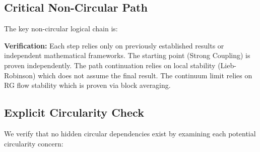 \subsection{Critical Non-Circular Path}

The key non-circular logical chain is:

\begin{center}
\end{center}

\textbf{Verification:} Each step relies only on previously established results or independent mathematical frameworks. The starting point (Strong Coupling) is proven independently. The path continuation relies on local stability (Lieb-Robinson) which does not assume the final result. The continuum limit relies on RG flow stability which is proven via block averaging.

\subsection{Explicit Circularity Check}

We verify that no hidden circular dependencies exist by examining each 
potential circularity concern:

